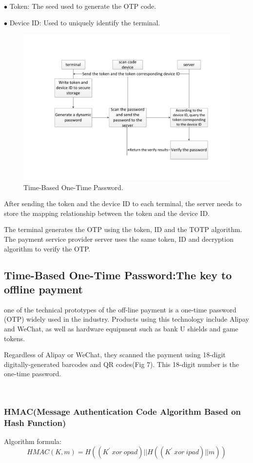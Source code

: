 \documentclass[journal]{IEEEtran}
\begin{document}
$\bullet$ Token: The seed used to generate the OTP code. 

$\bullet$ Device ID: Used to uniquely identify the terminal.

\begin{figure}[htbp]
\centerline{\includegraphics[scale=0.4]{TOTP2.pdf}}
\caption{Time-Based One-Time Password.}
\label{fig}
\end{figure}

After sending the token and the device ID to each terminal, the server needs to store the mapping relationship between the token and the device ID.

The terminal generates the OTP using the token, ID and the TOTP algorithm. The payment service provider server uses the same token, ID and decryption algorithm to verify the OTP.

\subsection{Time-Based One-Time Password:The key to offline payment}
one of the technical prototypes of the off-line payment is a one-time password (OTP) widely used in the industry. Products using this technology include Alipay and WeChat, as well as hardware equipment such as bank U shields and game tokens.

Regardless of Alipay or WeChat, they scanned the payment using 18-digit digitally-generated barcodes and QR codes(Fig 7). This 18-digit number is the one-time password. 

\

\subsubsection{HMAC(Message Authentication Code Algorithm Based on Hash Function)}
Algorithm formula:
$$HMAC(K, m) = H((K^{\prime}~xor~opad) || H ((K^{\prime}~xor~ipad) || m)) $$
\end{document}
